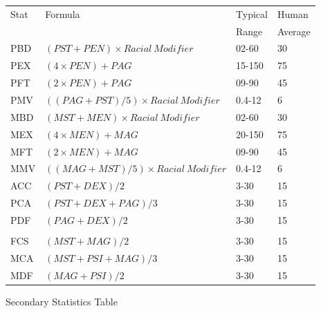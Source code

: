 
\begin{SHTable}[h]
	\begin{tabular}{l|l|l|l}
	Stat & Formula										& Typical & Human \\ 
		 &								   				& Range	 & Average \\ 
	\hline
	PBD  & \((PST+PEN) \times {Racial\ Modifier}\)	    & 02-60	 & 30  \\
	PEX  & \((4 \times PEN) + PAG \)		 	        & 15-150 & 75  \\
	PFT  & \((2 \times PEN) +PAG\)			& 09-90 & 45  \\
	PMV  & \(((PAG+PST)/5) \times {Racial\ Modifier}\) & 0.4-12 & 6 \\ 
	\hline
	MBD  & \((MST+MEN) \times {Racial\ Modifier}\)		& 02-60	 & 30 \\
	MEX  & \((4 \times MEN) + MAG \)		& 20-150 & 75  \\
	MFT  & \((2 \times MEN) + MAG \)		& 09-90	 & 45 \\
	MMV  & \(((MAG+MST)/5) \times {Racial\ Modifier}\) & 0.4-12  & 6 \\ 
	\hline
	ACC  & \((PST+DEX)/2	 \)				& 3-30  & 15 \\
	PCA  & \((PST+DEX+PAG)/3 \)				& 3-30  & 15 \\
	PDF  & \((PAG+DEX)/2	 \)				& 3-30  & 15 \\
		 &									&		&	 \\ \hline
	FCS  & \((MST+MAG)/2	 \)				& 3-30  & 15 \\
	MCA  & \((MST+PSI+MAG)/3 \)				& 3-30  & 15 \\
	MDF  & \((MAG+PSI)/2	 \)				& 3-30  & 15 \\
	\end{tabular}
\caption{Secondary Statistics Table}\label{Table:SecondaryStatistics}
\end{SHTable}

